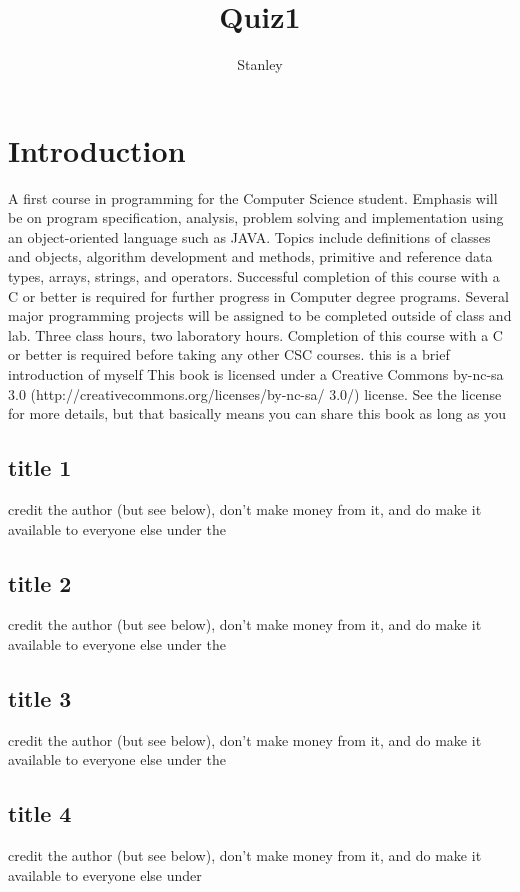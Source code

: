 \documentclass[10pt,a4paper]{article}
\author{Stanley}
\title{Quiz1}
\begin{document}
\maketitle
\tableofcontents
\newpage
%
\section{Introduction}\label{basics}
A first course in programming for the Computer Science student. Emphasis will be on program specification, analysis, problem solving and implementation using an object-oriented language such as JAVA. Topics include definitions of classes and objects, algorithm development and methods, primitive and reference data types, arrays, strings, and operators. Successful completion of this course with a C or better is required for further progress in Computer degree programs. Several major programming projects will be assigned to be completed outside of class and lab. Three class hours, two laboratory hours. Completion of this course with a C or better is required before taking any other CSC courses.
this is a brief introduction of myself
This book is licensed under a Creative Commons by-nc-sa 3.0 (http://creativecommons.org/licenses/by-nc-sa/
3.0/) license. See the license for more details, but that basically means you can share this book as long as you
\subsection{title 1}
credit the author (but see below), don't make money from it, and do make it available to everyone else under the
\subsection{title 2}
credit the author (but see below), don't make money from it, and do make it available to everyone else under the
\subsection{title 3}
credit the author (but see below), don't make money from it, and do make it available to everyone else under the
\subsection{title 4}
credit the author (but see below), don't make money from it, and do make it available to everyone else under
\end{document}
